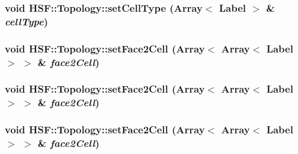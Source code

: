 \label{classHSF_1_1Topology_a42c3fe3a125b6b4576aeea273a9c849c}
\hypertarget{classHSF_1_1Topology_a42c3fe3a125b6b4576aeea273a9c849c}{
\subsubsection[{setCellType}]{\setlength{\rightskip}{0pt plus 5cm}void HSF::Topology::setCellType (Array$<$ {\bf Label} $>$ \& {\em cellType})}}
\label{classHSF_1_1Topology_a42c3fe3a125b6b4576aeea273a9c849c}
\hypertarget{classHSF_1_1Topology_a61f5c30ee928367a573f8b4b139ecd8f}{
\subsubsection[{setFace2Cell}]{\setlength{\rightskip}{0pt plus 5cm}void HSF::Topology::setFace2Cell (Array$<$ Array$<$ {\bf Label} $>$ $>$ \& {\em face2Cell})}}
\label{classHSF_1_1Topology_a61f5c30ee928367a573f8b4b139ecd8f}
\hypertarget{classHSF_1_1Topology_a61f5c30ee928367a573f8b4b139ecd8f}{
\subsubsection[{setFace2Cell}]{\setlength{\rightskip}{0pt plus 5cm}void HSF::Topology::setFace2Cell (Array$<$ Array$<$ {\bf Label} $>$ $>$ \& {\em face2Cell})}}
\label{classHSF_1_1Topology_a61f5c30ee928367a573f8b4b139ecd8f}
\hypertarget{classHSF_1_1Topology_a61f5c30ee928367a573f8b4b139ecd8f}{
\subsubsection[{setFace2Cell}]{\setlength{\rightskip}{0pt plus 5cm}void HSF::Topology::setFace2Cell (Array$<$ Array$<$ {\bf Label} $>$ $>$ \& {\em face2Cell})}}
